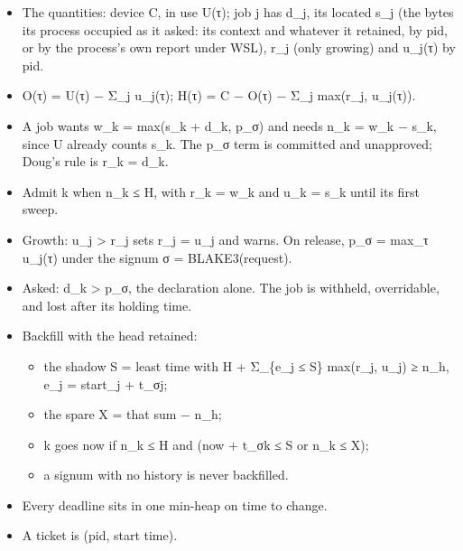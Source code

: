 \begin{itemize}
\item The quantities: device C, in use U(τ); job j has d\_\allowbreak{}j, its located s\_\allowbreak{}j (the bytes its process occupied as it asked: its context and whatever it retained, by pid, or by the process's own report under WSL), r\_\allowbreak{}j (only growing) and u\_\allowbreak{}j(τ) by pid.
\item O(τ) = U(τ) − Σ\_\allowbreak{}j u\_\allowbreak{}j(τ); H(τ) = C − O(τ) − Σ\_\allowbreak{}j max(r\_\allowbreak{}j, u\_\allowbreak{}j(τ)).
\item A job wants w\_\allowbreak{}k = max(s\_\allowbreak{}k + d\_\allowbreak{}k, p\_\allowbreak{}σ) and needs n\_\allowbreak{}k = w\_\allowbreak{}k − s\_\allowbreak{}k, since U already counts s\_\allowbreak{}k. The p\_\allowbreak{}σ term is committed and unapproved; Doug's rule is r\_\allowbreak{}k = d\_\allowbreak{}k.
\item Admit k when n\_\allowbreak{}k ≤ H, with r\_\allowbreak{}k = w\_\allowbreak{}k and u\_\allowbreak{}k = s\_\allowbreak{}k until its first sweep.
\item Growth: u\_\allowbreak{}j > r\_\allowbreak{}j sets r\_\allowbreak{}j = u\_\allowbreak{}j and warns. On release, p\_\allowbreak{}σ = max\_\allowbreak{}τ u\_\allowbreak{}j(τ) under the signum σ = BLAKE3(request).
\item Asked: d\_\allowbreak{}k > p\_\allowbreak{}σ, the declaration alone. The job is withheld, overridable, and lost after its holding time.
\item Backfill with the head retained:

\begin{itemize}
\item the shadow S = least time with H + Σ\_\allowbreak{}\{e\_\allowbreak{}j ≤ S\} max(r\_\allowbreak{}j, u\_\allowbreak{}j) ≥ n\_\allowbreak{}h, e\_\allowbreak{}j = start\_\allowbreak{}j + t\_\allowbreak{}σj;
\item the spare X = that sum − n\_\allowbreak{}h;
\item k goes now if n\_\allowbreak{}k ≤ H and (now + t\_\allowbreak{}σk ≤ S or n\_\allowbreak{}k ≤ X);
\item a signum with no history is never backfilled.
\end{itemize}
\item Every deadline sits in one min-heap on time to change.
\item A ticket is (pid, start time).
\end{itemize}


